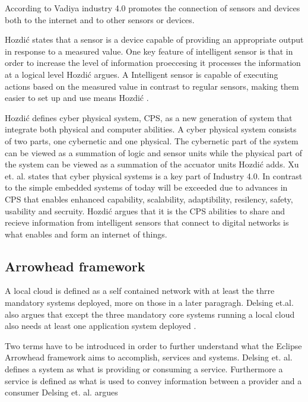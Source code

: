 According to Vadiya \cite{Vaidya2018} industry 4.0 promotes the connection of sensors and devices both to the internet and to other sensors or devices.

Hozdić \cite{Hozdic2015} states that a sensor is a device capable of providing an appropriate output in response to a measured value.
One key feature of intelligent sensor is that in order to increase the level of information proeccesing it processes the information at a logical level Hozdić \cite{Hozdic2015} argues.
A Intelligent sensor  is capable of executing actions based on the measured value in contrast to regular sensors, making them easier to set up and use means Hozdić \cite{Hozdic2015}.

Hozdić defines cyber physical system, CPS, as a new generation of system that integrate both physical and computer abilities. \cite{Hozdic2015}
A cyber physical system consists of two parts, one cybernetic and one physical.
The cybernetic part of the system can be viewed as a summation of logic and sensor units while the physical part of the system can be viewed as a summation of the accuator units Hozdić adds. \cite{Hozdic2015}
Xu et. al. states that cyber physical systems is a key part of Industry 4.0. In contrast to the simple embedded systems of today will be exceeded due to advances in CPS that enables enhanced capability, scalability, adaptibility, resilency, safety, usability and secruity.  \cite{Xu2018}
Hozdić argues that it is the CPS abilities to share and recieve information from intelligent sensors that connect to digital networks is what enables and form an internet of things. \cite{Hozdic2015}
 
\subsection{Arrowhead framework}
A local cloud is defined as a self contained network with at least the thrre mandatory systems deployed, more on those in a later paragragh. 
Delsing et.al. also argues that except the three mandatory core systems running a local cloud also needs at least one application system deployed \cite{Delsing2017}.

Two terms have to be introduced in order to further understand what the Eclipse Arrowhead framework aims to accomplish, services and systems.
Delsing et. al. defines a system as what is providing or consuming a service. \cite{Delsing2017} 
Furthermore a service is defined as what is used to convey information between a provider and a consumer Delsing et. al. argues \cite{Delsing2017}


